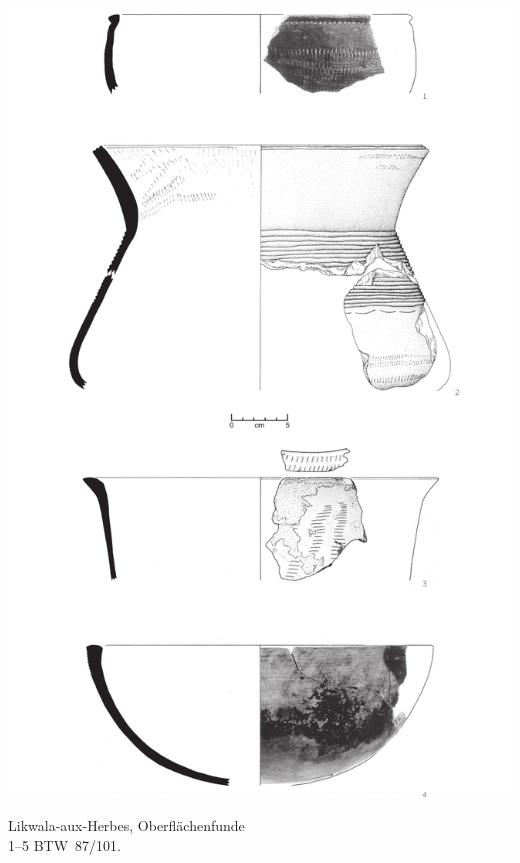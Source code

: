 \begin{pl}[H]
	\includegraphics{plt/Taf71.pdf}
	\vspace{.75em}\caption{Likwala-aux-Herbes, Oberflächenfunde \\ 1--5 BTW~87/101.}
	\label{pl:71}
\end{pl}

